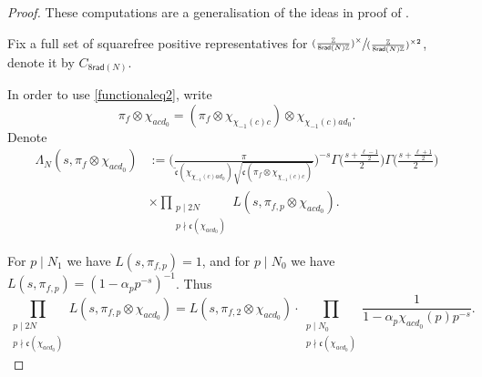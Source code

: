 \documentclass[12pt,reqno]{amsart}
\theoremstyle{plain}
\theoremstyle{remark}
\numberwithin{equation}{section}
\numberwithin{lemma}{section}
\numberwithin{theorem}{section}
\numberwithin{prop}{section}
\numberwithin{remark}{section}
\begin{document}
\begin{proof}
These computations are a generalisation of the ideas in proof of \cite[Theorem~2.3]{DW}.

Fix a full set of squarefree positive representatives for
 $\sfrac{(\frac{\mathbb{Z}}{8 \mathsf{rad}(N) \mathbb{Z}})^{\times}}{(\frac{\mathbb{Z}}{8 \mathsf{rad}(N) \mathbb{Z}})^{\times 2}}$, 
 denote it by $C_{8 \mathsf{rad}(N)}$. 

 In order to use \eqref{functionaleq2}, write
 \begin{equation*}
 \pi_f \otimes \chi_{acd_0}=(\pi_f \otimes \chi_{\chi_{-1}(c)c}) \otimes \chi_{\chi_{-1}(c) ad_0}.
 \end{equation*}
Denote
\begin{align*}
\Lambda_N (s,\pi_f \otimes \chi_{a c d_0})&:= 
\Bigg( \frac{\pi}{\widetilde{\mathfrak{c}}(\chi_{\chi_{-1}(c) ad_0})  \sqrt{\mathfrak{c}(\pi_f \otimes \chi_{\chi_{-1}(c)c}  )}} \Bigg)^{-s}  
 \Gamma \Big(\frac{s+\frac{\ell-1}{2}}{2} \Big) \Gamma \Big(\frac{s+\frac{\ell+1}{2}}{2} \Big) \\
& \times \prod_{\substack{p \mid 2N \\ p \nmid \mathfrak{c}(\chi_{acd_0})  }} L(s, \pi_{f,p} \otimes \chi_{a c d_0}). 
\end{align*}

For $p \mid N_1$ we have $L(s,\pi_{f,p})=1$, and for $p \mid N_0$ 
we have $L(s,\pi_{f,p})=(1-\alpha_p p^{-s})^{-1}$. Thus
\begin{equation} \label{localprod}
\prod_{\substack{p \mid 2 N \\ p \nmid \mathfrak{c}(\chi_{acd_0})}} L(s, \pi_{f,p} \otimes \chi_{a c d_0})=
L(s,\pi_{f,2} \otimes \chi_{acd_0})
\cdot \prod_{\substack{p \mid N_0 \\ p \nmid \mathfrak{c}(\chi_{acd_0}) }} \frac{1}{1-\alpha_p \chi_{acd_0}(p)  p^{-s}}.
\end{equation}


\end{proof}
\end{document}
